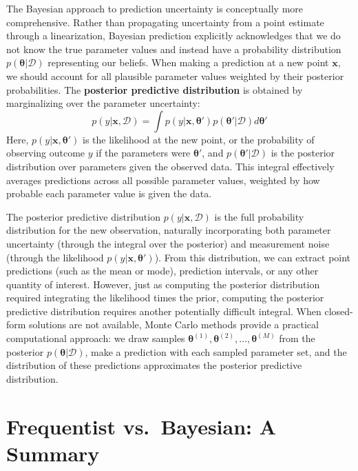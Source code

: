 The Bayesian approach to prediction uncertainty is conceptually more comprehensive. Rather than propagating uncertainty from a point estimate through a linearization, Bayesian prediction explicitly acknowledges that we do not know the true parameter values and instead have a probability distribution $p(\boldsymbol{\theta}|\mathcal{D})$ representing our beliefs. When making a prediction at a new point $\mathbf{x}$, we should account for all plausible parameter values weighted by their posterior probabilities. The \textbf{posterior predictive distribution} is obtained by marginalizing over the parameter uncertainty:
\begin{equation}
    p(y|\mathbf{x}, \mathcal{D}) = \int p(y|\mathbf{x}, \boldsymbol{\theta}')p(\boldsymbol{\theta}'|\mathcal{D})d\boldsymbol{\theta}'
\end{equation}
Here, $p(y|\mathbf{x}, \boldsymbol{\theta}')$ is the likelihood at the new point, or the probability of observing outcome $y$ if the parameters were $\boldsymbol{\theta}'$, and $p(\boldsymbol{\theta}'|\mathcal{D})$ is the posterior distribution over parameters given the observed data. This integral effectively averages predictions across all possible parameter values, weighted by how probable each parameter value is given the data.

The posterior predictive distribution $p(y|\mathbf{x}, \mathcal{D})$ is the full probability distribution for the new observation, naturally incorporating both parameter uncertainty (through the integral over the posterior) and measurement noise (through the likelihood $p(y|\mathbf{x}, \boldsymbol{\theta}')$). From this distribution, we can extract point predictions (such as the mean or mode), prediction intervals, or any other quantity of interest. However, just as computing the posterior distribution required integrating the likelihood times the prior, computing the posterior predictive distribution requires another potentially difficult integral. When closed-form solutions are not available, Monte Carlo methods provide a practical computational approach: we draw samples $\boldsymbol{\theta}^{(1)}, \boldsymbol{\theta}^{(2)}, \ldots, \boldsymbol{\theta}^{(M)}$ from the posterior $p(\boldsymbol{\theta}|\mathcal{D})$, make a prediction with each sampled parameter set, and the distribution of these predictions approximates the posterior predictive distribution.

\section{Frequentist vs.\ Bayesian: A Summary}

